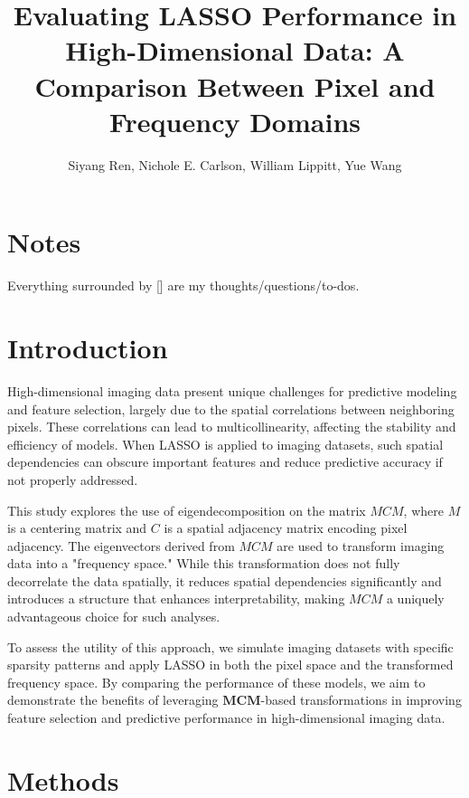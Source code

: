 \documentclass[12pt]{article}
\begin{document}
\title{Evaluating LASSO Performance in High-Dimensional Data: A Comparison Between Pixel and Frequency Domains}
\author{Siyang Ren, Nichole E. Carlson, William Lippitt, Yue Wang}
\date{}
\maketitle


\section*{Notes}

Everything surrounded by [] are my thoughts/questions/to-dos.


\section{Introduction}

High-dimensional imaging data present unique challenges for predictive modeling and feature selection, largely due to the spatial correlations between neighboring pixels. These correlations can lead to multicollinearity, affecting the stability and efficiency of models. When LASSO is applied to imaging datasets, such spatial dependencies can obscure important features and reduce predictive accuracy if not properly addressed.

This study explores the use of eigendecomposition on the matrix \( MCM \), where \( M \) is a centering matrix and \( C \) is a spatial adjacency matrix encoding pixel adjacency. The eigenvectors derived from \( MCM \) are used to transform imaging data into a "frequency space." While this transformation does not fully decorrelate the data spatially, it reduces spatial dependencies significantly and introduces a structure that enhances interpretability, making \( MCM \) a uniquely advantageous choice for such analyses.

To assess the utility of this approach, we simulate imaging datasets with specific sparsity patterns and apply LASSO in both the pixel space and the transformed frequency space. By comparing the performance of these models, we aim to demonstrate the benefits of leveraging \( \mathbf{MCM} \)-based transformations in improving feature selection and predictive performance in high-dimensional imaging data.



\section{Methods}
\end{document}
